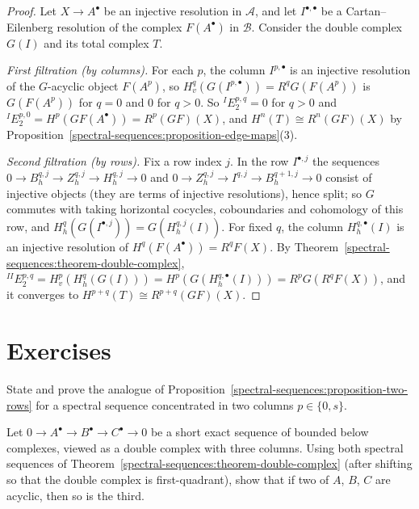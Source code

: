 \begin{proof}
Let $X \to A^\bullet$ be an injective resolution in $\mathcal{A}$, and let $I^{\bullet,\bullet}$ be a Cartan--Eilenberg resolution of the complex $F(A^\bullet)$ in
$\mathcal{B}$. Consider the double complex $G(I)$ and its total complex $T$.

\emph{First filtration (by columns).} For each $p$, the column $I^{p,\bullet}$ is an injective resolution of the $G$-acyclic object $F(A^p)$, so
$H^q_v(G(I^{p,\bullet})) = R^qG(F(A^p))$ is $G(F(A^p))$ for $q = 0$ and $0$ for $q > 0$. So ${}^IE_2^{p,q} = 0$ for $q > 0$ and
${}^IE_2^{p,0} = H^p(GF(A^\bullet)) = R^p(GF)(X)$, and $H^n(T) \cong R^n(GF)(X)$ by Proposition~\ref{spectral-sequences:proposition-edge-maps}(3).

\emph{Second filtration (by rows).} Fix a row index $j$. In the row $I^{\bullet,j}$ the sequences
$0 \to B^{q,j}_h \to Z^{q,j}_h \to H^{q,j}_h \to 0$ and $0 \to Z^{q,j}_h \to I^{q,j} \to B^{q+1,j}_h \to 0$ consist of injective objects (they are terms of
injective resolutions), hence split; so $G$ commutes with taking horizontal cocycles, coboundaries and cohomology of this row, and
$H^q_h(G(I^{\bullet,j})) = G(H^{q,j}_h(I))$. For fixed $q$, the column $H^{q,\bullet}_h(I)$ is an injective resolution of
$H^q(F(A^\bullet)) = R^qF(X)$. By Theorem~\ref{spectral-sequences:theorem-double-complex},
${}^{II}E_2^{p,q} = H^p_v(H^q_h(G(I))) = H^p(G(H^{q,\bullet}_h(I))) = R^pG(R^qF(X))$, and it converges to
$H^{p+q}(T) \cong R^{p+q}(GF)(X)$.
\end{proof}

\section{Exercises}\label{spectral-sequences:section-exercises}

\begin{exercise}\label{spectral-sequences:exercise-two-columns}
State and prove the analogue of Proposition~\ref{spectral-sequences:proposition-two-rows} for a spectral sequence concentrated in two
columns $p \in \{0, s\}$.
\end{exercise}

\begin{exercise}\label{spectral-sequences:exercise-two-out-of-three}
Let $0 \to A^\bullet \to B^\bullet \to C^\bullet \to 0$ be a short exact sequence of bounded below complexes, viewed as a double complex with three
columns. Using both spectral sequences of Theorem~\ref{spectral-sequences:theorem-double-complex} (after shifting so that the double complex is
first-quadrant), show that if two of $A$, $B$, $C$ are acyclic, then so is the third.
\end{exercise}

